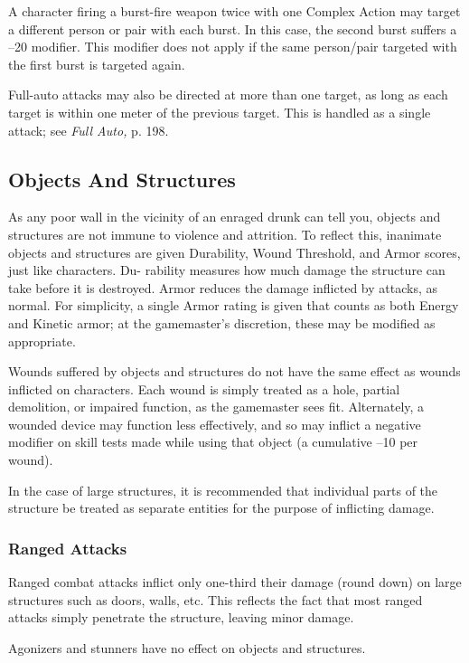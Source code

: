 A character firing a burst-fire weapon twice with 
one Complex Action may target a different person or 
pair with each burst. In this case, the second burst 
suffers a –20 modifier. This modifier does not apply 
if the same person/pair targeted with the first burst is 
targeted again.

Full-auto attacks may also be directed at more than 
one target, as long as each target is within one meter 
of the previous target. This is handled as a single 
attack; see \textit{Full Auto,} p. 198.

\subsection{Objects And Structures}

As any poor wall in the vicinity of an enraged drunk 
can tell you, objects and structures are not immune 
to violence and attrition. To reflect this, inanimate 
objects and structures are given Durability, Wound 
Threshold, and Armor scores, just like characters. Du-
rability measures how much damage the structure can 
take before it is destroyed. Armor reduces the damage 
inflicted by attacks, as normal. For simplicity, a single 
Armor rating is given that counts as both Energy and 
Kinetic armor; at the gamemaster's discretion, these 
may be modified as appropriate.

Wounds suffered by objects and structures do not have 
the same effect as wounds inflicted on characters. Each 
wound is simply treated as a hole, partial demolition, or 
impaired function, as the gamemaster sees fit. Alternately, 
a wounded device may function less effectively, and so 
may inflict a negative modifier on skill tests made while 
using that object (a cumulative –10 per wound).

In the case of large structures, it is recommended 
that individual parts of the structure be treated as 
separate entities for the purpose of inflicting damage.

\subsubsection{Ranged Attacks}

Ranged combat attacks inflict only one-third their 
damage (round down) on large structures such 
as doors, walls, etc. This reflects the fact that most 
ranged attacks simply penetrate the structure, leaving 
minor damage.

Agonizers and stunners have no effect on objects 
and structures.

